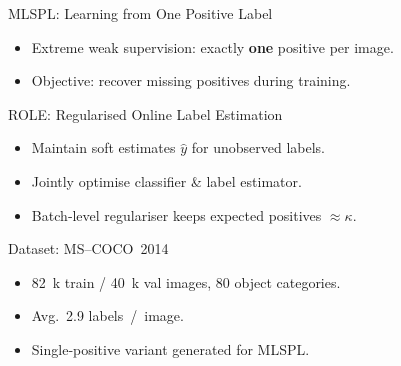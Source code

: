 \begin{frame}{MLSPL: Learning from One Positive Label}
  \begin{itemize}
    \item Extreme weak supervision: exactly \textbf{one} positive per image.
    \item Objective: recover missing positives during training.
  \end{itemize}
\end{frame}

\begin{frame}{ROLE: Regularised Online Label Estimation}
  \begin{itemize}
    \item Maintain soft estimates $\hat{y}$ for unobserved labels.
    \item Jointly optimise classifier \& label estimator.
    \item Batch‑level regulariser keeps expected positives $\approx \kappa$.
  \end{itemize}
\end{frame}

\begin{frame}{Dataset: MS--COCO 2014}
  \begin{itemize}
    \item 82 k train / 40 k val images, 80 object categories.
    \item Avg. 2.9 labels / image.
    \item Single‑positive variant generated for MLSPL.
  \end{itemize}
\end{frame}
